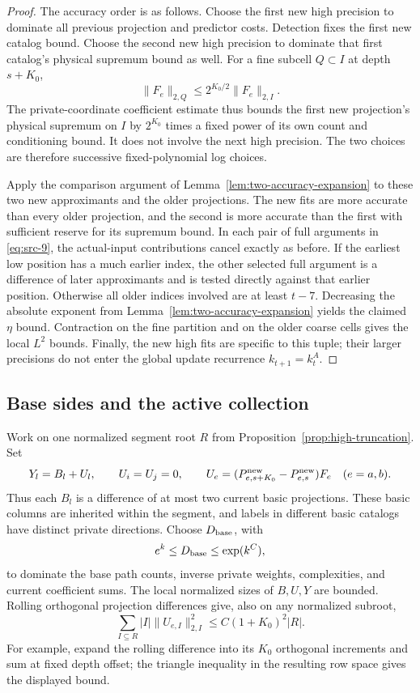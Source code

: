 \begin{proof}
The accuracy order is as follows.  Choose the first new
high precision to dominate all previous projection and
predictor costs.  Detection fixes the first new catalog
bound.  Choose the second new high precision to dominate
that first catalog's physical supremum bound as well.
For a fine subcell $Q\subset I$ at depth $s+K_0$,
\[
 \|F_e\|_{2,Q}\le 2^{K_0/2}\|F_e\|_{2,I}.
\]
The private-coordinate coefficient estimate thus bounds
the first new projection's physical supremum on $I$ by
$2^{K_0}$ times a fixed power of its own count and
conditioning bound.  It does not involve the next high
precision.  The two choices are therefore successive
fixed-polynomial log choices.

Apply the comparison argument of
Lemma~\ref{lem:two-accuracy-expansion} to these two new
approximants and the older projections.  The new fits are
more accurate than every older projection, and the second
is more accurate than the first with sufficient reserve
for its supremum bound.  In each pair of full arguments
in \eqref{eq:src-9}, the actual-input contributions cancel
exactly as before.  If the earliest low position has a
much earlier index, the other selected full argument is
a difference of later approximants and is tested directly
against that earlier position.  Otherwise all older
indices involved are at least $t-7$.  Decreasing the
absolute exponent from
Lemma~\ref{lem:two-accuracy-expansion} yields the claimed
$\eta$ bound.  Contraction on the fine partition and on
the older coarse cells gives the local $L^2$ bounds.
Finally, the new high fits are specific to this tuple;
their larger precisions do not enter the global update
recurrence $k_{t+1}=k_t^A$.
\end{proof}

\subsection{Base sides and the active collection}

Work on one normalized segment root $R$ from
Proposition~\ref{prop:high-truncation}.  Set
\[
 Y_l=B_l+U_l,\qquad U_i=U_j=0,
 \qquad
 U_e=(P^{\rm new}_{e,s+K_0}-P^{\rm new}_{e,s})F_e
 \quad(e=a,b).
\]
Thus each $B_l$ is a difference of at most two current
basic projections.  These basic columns are inherited
within the segment, and labels in different basic
catalogs have distinct private directions.  Choose
$D_{\rm base}$, with
\[
 e^k\le D_{\rm base}\le\exp(k^C),
\]
to dominate the base path counts, inverse private
weights, complexities, and current coefficient sums.
The local normalized sizes of $B,U,Y$ are bounded.
Rolling orthogonal projection differences give, also
on any normalized subroot,
\[
 \sum_{I\subseteq R}|I|\|U_{e,I}\|_{2,I}^2
 \le C(1+K_0)^2|R|.
\]
For example, expand the rolling difference into its
$K_0$ orthogonal increments and sum at fixed depth
offset; the triangle inequality in the resulting
row space gives the displayed bound.


